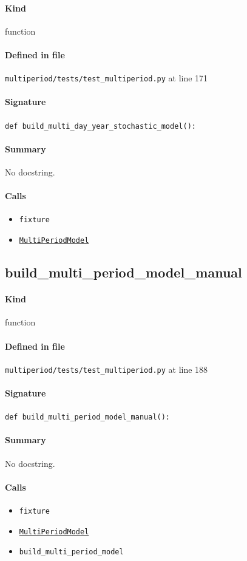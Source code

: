 \documentclass[11pt]{report}
\begin{document}
\paragraph{Kind} function
\paragraph{Defined in file} \texttt{multiperiod/tests/test\_multiperiod.py} at line 171
\paragraph{Signature} \texttt{def build\_multi\_day\_year\_stochastic\_model():}
\paragraph{Summary} No docstring.
\paragraph{Calls}
\begin{itemize}[leftmargin=*]
  \item \texttt{fixture}
  \item \hyperref[def:multiperiod-multiperiod.py:MultiPeriodModel:L24]{\texttt{MultiPeriodModel}}
\end{itemize}
\subsection{build\_multi\_period\_model\_manual}
\label{def:multiperiod-tests-test_multiperiod.py:build_multi_period_model_manual:L188}
\paragraph{Kind} function
\paragraph{Defined in file} \texttt{multiperiod/tests/test\_multiperiod.py} at line 188
\paragraph{Signature} \texttt{def build\_multi\_period\_model\_manual():}
\paragraph{Summary} No docstring.
\paragraph{Calls}
\begin{itemize}[leftmargin=*]
  \item \texttt{fixture}
  \item \hyperref[def:multiperiod-multiperiod.py:MultiPeriodModel:L24]{\texttt{MultiPeriodModel}}
  \item \texttt{build\_multi\_period\_model}
\end{itemize}
\end{document}
